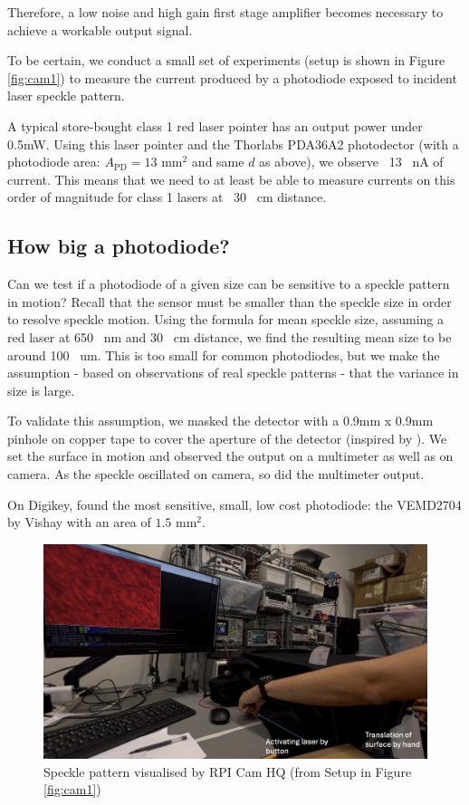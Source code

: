 Therefore, a low noise and high gain first stage amplifier becomes necessary to achieve a workable output signal. 

To be certain, we conduct a small set of experiments (setup is shown in Figure \ref{fig:cam1}) to measure the current produced by a photodiode exposed to incident laser speckle pattern.

A typical store-bought class 1 red laser pointer has an output power under 0.5mW. 
Using this laser pointer and the Thorlabs PDA36A2 photodector (with a photodiode area: $A_{\text{PD}} = 13\text{ mm}^2$ and same $d$ as above), we observe ~13 ~nA of current.
This means that we need to at least be able to measure currents on this order of magnitude for class 1 lasers at ~30 ~cm distance.


\subsection{How big a photodiode?}
Can we test if a photodiode of a given size can be sensitive to a speckle pattern in motion? Recall that the sensor must be smaller than the speckle size in order to resolve speckle motion. Using the formula for mean speckle size, assuming a red laser at 650 ~nm and 30 ~cm distance, we find the resulting mean size to be around 100 ~um. This is too small for common photodiodes, but we make the assumption - based on observations of real speckle patterns - that the variance in size is large.

To validate this assumption, we masked the detector with a 0.9mm x 0.9mm pinhole on copper tape to cover the aperture of the detector (inspired by \cite{veber2011laserMASK}). 
We set the surface in motion and observed the output on a multimeter as well as on camera. As the speckle oscillated on camera, so did the multimeter output.

On Digikey, found the most sensitive, small, low cost photodiode: the VEMD2704 by Vishay with an area of $1.5\text{ mm}^2$.


\begin{figure}[t]
  \centering
  \includegraphics[width=\widthnarrow]{figures/impl/camera_setup2.png}
  \caption{Speckle pattern visualised by RPI Cam HQ (from Setup in Figure \ref{fig:cam1})}
  \label{fig:cam2}
\end{figure}

